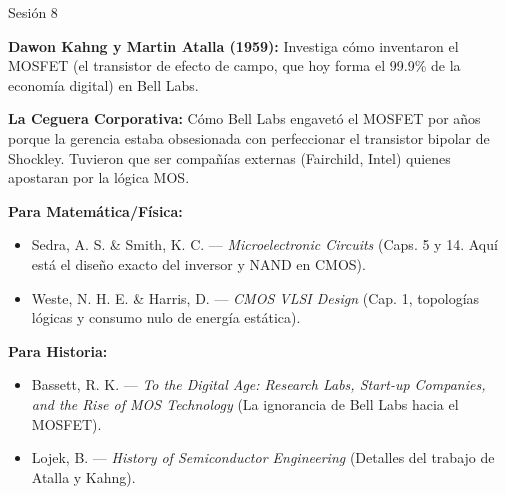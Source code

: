 \documentclass[11pt, letterpaper]{article}
\begin{document}
\begin{historia}{Sesi\'on 8}
\begin{checklist}
  \item \textbf{Dawon Kahng y Martin Atalla (1959):} Investiga c\'omo inventaron el MOSFET (el transistor de efecto de campo, que hoy forma el 99.9\% de la econom\'ia digital) en Bell Labs.
  \item \textbf{La Ceguera Corporativa:} C\'omo Bell Labs engavet\'o el MOSFET por a\~nos porque la gerencia estaba obsesionada con perfeccionar el transistor bipolar de Shockley. Tuvieron que ser compa\~n\'ias externas (Fairchild, Intel) quienes apostaran por la l\'ogica MOS.
\end{checklist}
\end{historia}

\begin{referencias}
\textbf{Para Matem\'atica/F\'isica:}
\begin{itemize}
    \item Sedra, A. S. \& Smith, K. C. --- \textit{Microelectronic Circuits} (Caps. 5 y 14. Aqu\'i est\'a el dise\~no exacto del inversor y NAND en CMOS).
    \item Weste, N. H. E. \& Harris, D. --- \textit{CMOS VLSI Design} (Cap. 1, topolog\'ias l\'ogicas y consumo nulo de energ\'ia est\'atica).
\end{itemize}
\textbf{Para Historia:}
\begin{itemize}
    \item Bassett, R. K. --- \textit{To the Digital Age: Research Labs, Start-up Companies, and the Rise of MOS Technology} (La ignorancia de Bell Labs hacia el MOSFET).
    \item Lojek, B. --- \textit{History of Semiconductor Engineering} (Detalles del trabajo de Atalla y Kahng).
\end{itemize}
\end{referencias}
\end{document}
